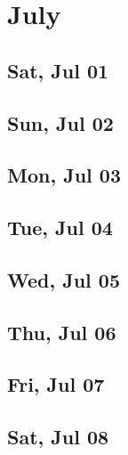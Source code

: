 \chapter{July}
	\section{Sat, Jul 01}
		
		
	\section{Sun, Jul 02}
		
		
	\section{Mon, Jul 03}
		
		
	\section{Tue, Jul 04}
		
		
	\section{Wed, Jul 05}
		
		
	\section{Thu, Jul 06}
		
		
	\section{Fri, Jul 07}
		
		
	\section{Sat, Jul 08}
		
		
